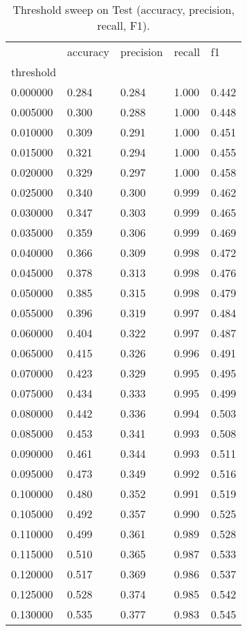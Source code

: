 \begin{table}[htbp]
\centering
\caption{Threshold sweep on Test (accuracy, precision, recall, F1).}
\label{tab:08-threshold-sweep}
\begin{tabular}{lllll}
\toprule
 & accuracy & precision & recall & f1 \\
threshold &  &  &  &  \\
\midrule
0.000000 & 0.284 & 0.284 & 1.000 & 0.442 \\
0.005000 & 0.300 & 0.288 & 1.000 & 0.448 \\
0.010000 & 0.309 & 0.291 & 1.000 & 0.451 \\
0.015000 & 0.321 & 0.294 & 1.000 & 0.455 \\
0.020000 & 0.329 & 0.297 & 1.000 & 0.458 \\
0.025000 & 0.340 & 0.300 & 0.999 & 0.462 \\
0.030000 & 0.347 & 0.303 & 0.999 & 0.465 \\
0.035000 & 0.359 & 0.306 & 0.999 & 0.469 \\
0.040000 & 0.366 & 0.309 & 0.998 & 0.472 \\
0.045000 & 0.378 & 0.313 & 0.998 & 0.476 \\
0.050000 & 0.385 & 0.315 & 0.998 & 0.479 \\
0.055000 & 0.396 & 0.319 & 0.997 & 0.484 \\
0.060000 & 0.404 & 0.322 & 0.997 & 0.487 \\
0.065000 & 0.415 & 0.326 & 0.996 & 0.491 \\
0.070000 & 0.423 & 0.329 & 0.995 & 0.495 \\
0.075000 & 0.434 & 0.333 & 0.995 & 0.499 \\
0.080000 & 0.442 & 0.336 & 0.994 & 0.503 \\
0.085000 & 0.453 & 0.341 & 0.993 & 0.508 \\
0.090000 & 0.461 & 0.344 & 0.993 & 0.511 \\
0.095000 & 0.473 & 0.349 & 0.992 & 0.516 \\
0.100000 & 0.480 & 0.352 & 0.991 & 0.519 \\
0.105000 & 0.492 & 0.357 & 0.990 & 0.525 \\
0.110000 & 0.499 & 0.361 & 0.989 & 0.528 \\
0.115000 & 0.510 & 0.365 & 0.987 & 0.533 \\
0.120000 & 0.517 & 0.369 & 0.986 & 0.537 \\
0.125000 & 0.528 & 0.374 & 0.985 & 0.542 \\
0.130000 & 0.535 & 0.377 & 0.983 & 0.545 \\

\end{tabular}
\end{table}
